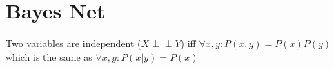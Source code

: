 \newcommand{\ind}{\perp\!\!\!\!\perp}

\section{Bayes Net}
Two variables are independent ($X\ind Y$) iff $\forall x,y: P(x,y)=P(x)P(y)$ which is the same as $\forall x,y: P(x|y)=P(x)$